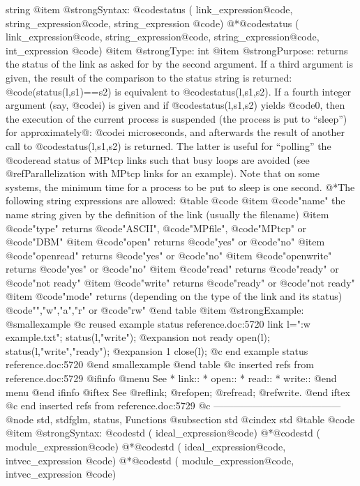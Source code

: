 {{{{{{{string
@item @strong{Syntax:}
@code{status (} link_expression@code{,} string_expression@code{,} string_expression @code{)}
@*@code{status (} link_expression@code{,} string_expression@code{,} string_expression@code{,} int_expression @code{)}
@item @strong{Type:}
int
@item @strong{Purpose:}
returns the status of the link as asked for by the second argument.  If
a third argument is given, the result of the comparison to the status
string is returned: @code{(status(l,s1)==s2)} is equivalent to
@code{status(l,s1,s2)}.  If a fourth integer argument (say, @code{i}) is
given and if @code{status(l,s1,s2)} yields @code{0}, then the execution
of the current process is suspended (the process is put to ``sleep'')
for approximately@: @code{i} microseconds, and afterwards the result of another
call to @code{status(l,s1,s2)} is returned. The latter is useful for
``polling'' the @code{read} status of MPtcp links such that busy
loops are avoided (see @ref{Parallelization with MPtcp links} for an
example).  Note that on some systems, the minimum time for a process to
be put to sleep is one second.
@*The following string expressions are allowed:
@table @code
@item @code{"name"}
the name string given by the definition of the link (usually the filename)
@item @code{"type"}
returns @code{"ASCII"}, @code{"MPfile"}, @code{"MPtcp"} or @code{"DBM"}
@item @code{"open"}
returns @code{"yes"} or @code{"no"}
@item @code{"openread"}
returns @code{"yes"} or @code{"no"}
@item @code{"openwrite"}
returns @code{"yes"} or @code{"no"}
@item @code{"read"}
returns @code{"ready"} or @code{"not ready"}
@item @code{"write"}
returns @code{"ready"} or @code{"not ready"}
@item @code{"mode"}
returns (depending on the type of the link and its status)
@code{"","w","a","r"} or @code{"rw"}
@end table
@item @strong{Example:}
@smallexample
@c reused example status reference.doc:5720 
  link l=":w example.txt";
  status(l,"write");
@expansion{} not ready
  open(l);
  status(l,"write","ready");
@expansion{} 1
  close(l);
@c end example status reference.doc:5720
@end smallexample
@end table
@c inserted refs from reference.doc:5729
@ifinfo
@menu
See
* link::
* open::
* read::
* write::
@end menu
@end ifinfo
@iftex
See
@ref{link};
@ref{open};
@ref{read};
@ref{write}.
@end iftex
@c end inserted refs from reference.doc:5729
@c ---------------------------------------
@node std, stdfglm, status, Functions
@subsection std
@cindex std
@table @code
@item @strong{Syntax:}
@code{std (} ideal_expression@code{)}
@*@code{std (} module_expression@code{)}
@*@code{std (} ideal_expression@code{,} intvec_expression @code{)}
@*@code{std (} module_expression@code{,} intvec_expression @code{)}
}}}}}}}
